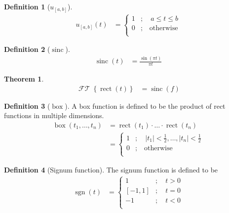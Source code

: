 \documentclass[titlepage, fleqn, a4paper, 12pt, twoside]{article}
\theoremstyle{definition}
\newtheorem{definition}{Definition}
\theoremstyle{theorem}
\newtheorem{theorem}{Theorem}
\DeclareMathOperator{\FT}{\mathcal{FT}}
\DeclareMathOperator{\rect}{\mathrm{rect}}
\DeclareMathOperator{\sinc}{\mathrm{sinc}}
\DeclareMathOperator{\boxfunc}{\mathrm{box}}
\DeclareMathOperator{\sgn}{\mathrm{sgn}}
\begin{document}
\begin{definition}[$u_{[a,b]}$]
	\begin{align*}
		u_{[a,b]}(t) &=
			\begin{cases}
				1 &;\quad a \le t \le b\\
				0 &;\quad \text{otherwise}\\
			\end{cases}
	\end{align*}
\end{definition}

\begin{definition}[$\sinc$]
	\begin{align*}
		\sinc(t) &= \frac{\sin(\pi t)}{\pi t}
	\end{align*}
\end{definition}

\begin{theorem}
	\begin{align*}
		\FT\left\{ \rect(t) \right\} &= \sinc(f)
	\end{align*}
\end{theorem}

\begin{definition}[$\boxfunc$]
	A box function is defined to be the product of rect functions in multiple dimensions.
	\begin{align*}
		\boxfunc(t_1,\dots,t_n) &= \rect(t_1) \cdot \dots \cdot \rect(t_n)\\
		&=
			\begin{cases}
				1 &;\quad |t_1| < \frac{1}{2}, \dots, |t_n| < \frac{1}{2}\\
				0 &;\quad \text{otherwise}\\
			\end{cases}
	\end{align*}
\end{definition}

\begin{definition}[Signum function]
	The signum function is defined to be
	\begin{align*}
		\sgn(t) &=
			\begin{cases}
				1 &;\quad t > 0\\
				[-1,1] &;\quad t = 0\\
				-1 &;\quad t < 0\\
			\end{cases}
	\end{align*}
\end{definition}
\end{document}
